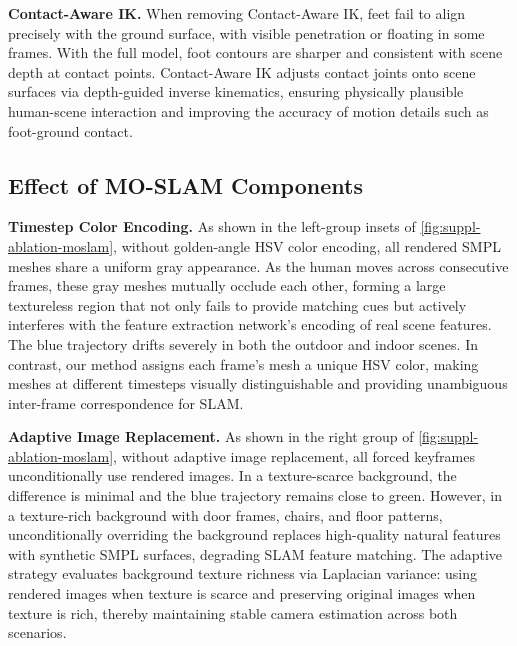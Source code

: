 \documentclass[runningheads]{llncs}
\begin{document}
\noindent\textbf{Contact-Aware IK.}
When removing Contact-Aware IK, feet fail to align precisely with the ground surface, with visible penetration or floating in some frames. With the full model, foot contours are sharper and consistent with scene depth at contact points. Contact-Aware IK adjusts contact joints onto scene surfaces via depth-guided inverse kinematics, ensuring physically plausible human-scene interaction and improving the accuracy of motion details such as foot-ground contact.


\subsection{Effect of MO-SLAM Components}


\noindent\textbf{Timestep Color Encoding.}
As shown in the left-group insets of \cref{fig:suppl-ablation-moslam}, without golden-angle HSV color encoding, all rendered SMPL meshes share a uniform gray appearance. As the human moves across consecutive frames, these gray meshes mutually occlude each other, forming a large textureless region that not only fails to provide matching cues but actively interferes with the feature extraction network's encoding of real scene features. The blue trajectory drifts severely in both the outdoor and indoor scenes. In contrast, our method assigns each frame's mesh a unique HSV color, making meshes at different timesteps visually distinguishable and providing unambiguous inter-frame correspondence for SLAM.

\noindent\textbf{Adaptive Image Replacement.}
As shown in the right group of \cref{fig:suppl-ablation-moslam}, without adaptive image replacement, all forced keyframes unconditionally use rendered images. In a texture-scarce background, the difference is minimal and the blue trajectory remains close to green. However, in a texture-rich background with door frames, chairs, and floor patterns, unconditionally overriding the background replaces high-quality natural features with synthetic SMPL surfaces, degrading SLAM feature matching. The adaptive strategy evaluates background texture richness via Laplacian variance: using rendered images when texture is scarce and preserving original images when texture is rich, thereby maintaining stable camera estimation across both scenarios.
\end{document}
